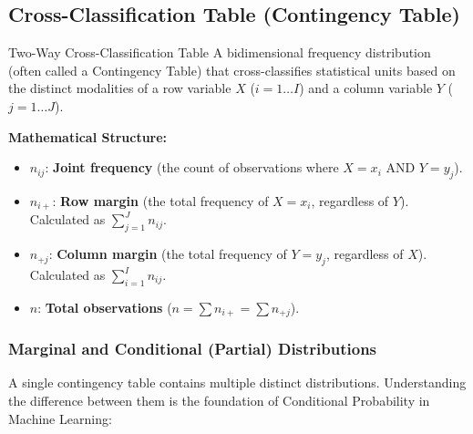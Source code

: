 \subsection{Cross-Classification Table (Contingency Table)}

\begin{defbox}{Two-Way Cross-Classification Table}
A bidimensional frequency distribution (often called a Contingency Table) that cross-classifies statistical units based on the distinct modalities of a row variable $X$ ($i=1\dots I$) and a column variable $Y$ ($j=1\dots J$).
\end{defbox}

\textbf{Mathematical Structure:}
\begin{itemize}
    \item $n_{ij}$: \textbf{Joint frequency} (the count of observations where $X=x_i$ AND $Y=y_j$).
    \item $n_{i+}$: \textbf{Row margin} (the total frequency of $X=x_i$, regardless of $Y$). Calculated as $\sum_{j=1}^{J} n_{ij}$.
    \item $n_{+j}$: \textbf{Column margin} (the total frequency of $Y=y_j$, regardless of $X$). Calculated as $\sum_{i=1}^{I} n_{ij}$.
    \item $n$: \textbf{Total observations} ($n = \sum n_{i+} = \sum n_{+j}$).
\end{itemize}

\subsubsection{Marginal and Conditional (Partial) Distributions}

A single contingency table contains multiple distinct distributions. Understanding the difference between them is the foundation of Conditional Probability in Machine Learning:

